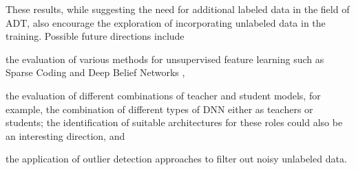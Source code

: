 \documentclass{article}
\begin{document}
These results, while suggesting the need for additional labeled data in the field of ADT, also encourage the exploration of incorporating unlabeled data in the training. 
Possible future directions include
\begin{inparaenum}[(i)]
	\item the evaluation of various methods for unsupervised feature learning such as Sparse Coding \cite{Raina2007a} and Deep Belief Networks \cite{Hamel2010},
    \item the evaluation of different combinations of teacher and student models, for example, the combination of different types of DNN either as teachers or students; the identification of suitable architectures for these roles could also be an interesting direction, and
    \item the application of outlier detection \cite{Lu2016} approaches to filter out noisy unlabeled data.   
\end{inparaenum} 



%
%
%
%
\end{document}
